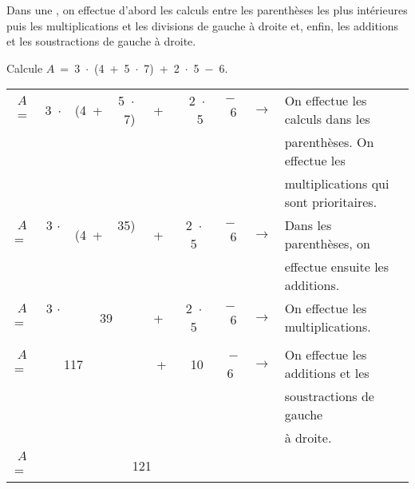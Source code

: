 
\begin{aconnaitre}
Dans une , on effectue d'abord les calculs entre les parenthèses les plus intérieures puis les multiplications et les divisions de gauche à droite et, enfin, les additions et les soustractions de gauche à droite.
\end{aconnaitre}

\begin{methode*1}

\begin{exemple*1}
Calcule $A$ = 3 $\cdot$ (4 + 5 $\cdot$ 7) + 2 $\cdot$ 5 $-$ 6.

\begin{center}
\begin{tabularx}{1.2\linewidth}{ccccccccX}
$A$=	 	& 3 $\cdot$	& (4 +	& 5 $\cdot$ 7)	& + & 2 $\cdot$  5	& $-$ 6	& $\rightarrow$ & On effectue les calculs dans les \\ \cline{4-4}
&&&&&&&&  parenthèses. On effectue les\\
&&&&&&&& multiplications qui sont prioritaires. \\
$A$= 	& 3 $\cdot$  	& (4 + 	&  35)  		&+ & 2 $\cdot$  5 	&$-$ 6  	& $\rightarrow$ & Dans les parenthèses, on \\ \cline{3-4}
 &&&&&&&& effectue ensuite les additions.\\
$A$= 	& 3 $\cdot$  	&    \multicolumn{2}{c}{39}      		     		& + & 2 $\cdot$  5 	&$-$ 6  	& $\rightarrow$ & On effectue les multiplications.\\ \cline{2-3}\cline{6-6}
 &&&&&&&& \\
$A$= 	&      		\multicolumn{2}{c}{117} &             			& +  & 10  			& $-$6  	& $\rightarrow$ & On effectue les additions et les \\ \cline{2-7}
 &&&&&&&& soustractions de gauche\\
 &&&&&&&& à droite.\\
$A$= 	&                \multicolumn{6}{c}{121}                             								&  & \\
\end{tabularx}
\end{center}
\end{exemple*1}




\end{methode*1}

